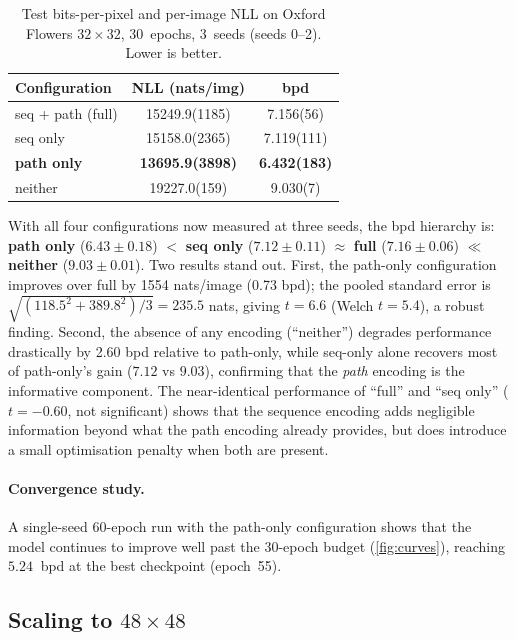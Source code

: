 \documentclass[conference]{IEEEtran}
\begin{document}
\begin{table}[t]
\centering
\caption{Test bits-per-pixel and per-image NLL on Oxford Flowers
$32\times32$, 30~epochs, 3~seeds (seeds 0--2). Lower is better.}
\label{tab:main}
\begin{tabular}{l S[table-format=5.1(4)] S[table-format=1.3(3)]}
\toprule
Configuration & {NLL (nats/img)} & {bpd} \\
\midrule
seq + path (full)    & 15249.9(1185) & 7.156(56)  \\
seq only             & 15158.0(2365) & 7.119(111) \\
\textbf{path only}   & \bfseries 13695.9(3898) & \bfseries 6.432(183) \\
neither              & 19227.0(159)  & 9.030(7)   \\
\bottomrule
\end{tabular}
\end{table}

With all four configurations now measured at three seeds, the
bpd hierarchy is: \textbf{path only} ($6.43 \pm 0.18$)
$<$ \textbf{seq only} ($7.12 \pm 0.11$)
$\approx$ \textbf{full} ($7.16 \pm 0.06$)
$\ll$ \textbf{neither} ($9.03 \pm 0.01$).
Two results stand out. First, the path-only configuration improves
over full by \num{1554} nats/image (\SI{0.73}{} bpd); the pooled
standard error is $\sqrt{(118.5^2+389.8^2)/3}=\num{235.5}$ nats,
giving $t=\num{6.6}$ (Welch $t=\num{5.4}$), a robust finding.
Second, the absence of any encoding (``neither'') degrades
performance drastically by \SI{2.60}{} bpd relative to path-only,
while seq-only alone recovers most of path-only's gain ($7.12$ vs
$9.03$), confirming that the \emph{path} encoding is the
informative component. The near-identical performance of ``full''
and ``seq only'' ($t=-0.60$, not significant) shows that the
sequence encoding adds negligible information beyond what the
path encoding already provides, but does
introduce a small optimisation penalty when both are present.

\paragraph{Convergence study.}
A single-seed 60-epoch run with the path-only configuration shows
that the model continues to improve well past the 30-epoch budget
(\cref{fig:curves}), reaching $\SI{5.24}{}$ bpd at the best
checkpoint (epoch~55).



\subsection{Scaling to $48\times48$}\label{ssec:scale}
\end{document}
